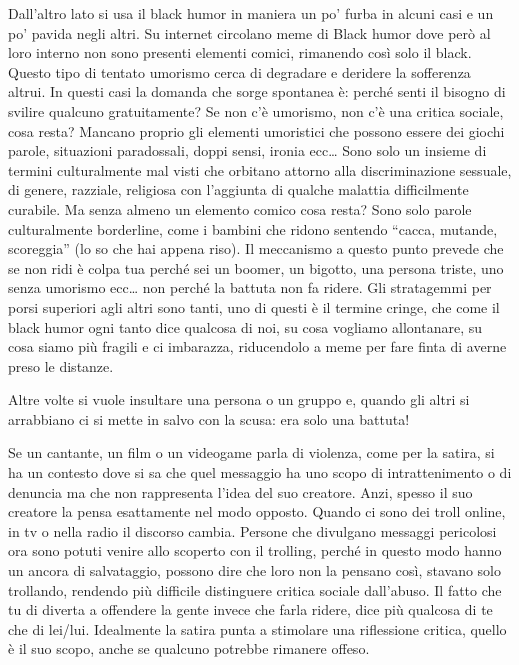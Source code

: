 \documentclass[12pt]{book} %
\begin{document}
\begin{mdframed}[linewidth=1pt]
Dall'altro lato si usa il black humor in maniera un po' furba in alcuni casi e
un po' pavida negli altri. Su internet circolano meme di Black humor dove però al loro interno non
sono presenti elementi comici, rimanendo così solo il black. Questo tipo di tentato umorismo cerca di degradare e
deridere la sofferenza altrui. In questi casi la domanda che sorge spontanea è: perché senti il bisogno di svilire
qualcuno gratuitamente? Se non c'è umorismo, non c'è una critica sociale, cosa resta? Mancano proprio gli elementi
umoristici che possono essere dei giochi parole, situazioni paradossali, doppi sensi, ironia ecc… Sono solo un insieme
di termini culturalmente mal visti che orbitano attorno alla discriminazione sessuale, di genere, razziale, religiosa
con l'aggiunta di qualche malattia difficilmente curabile. Ma senza almeno un elemento comico cosa
resta? Sono solo parole culturalmente borderline, come i bambini che ridono sentendo “cacca, mutande, scoreggia” (lo so
che hai appena riso). Il meccanismo a questo punto prevede che se non ridi è colpa tua perché sei un boomer, un
bigotto, una persona triste, uno senza umorismo ecc… non perché la battuta non fa ridere.
Gli stratagemmi per porsi superiori agli altri sono tanti, uno di questi è il termine cringe, che come il black humor ogni tanto dice qualcosa di noi, su cosa vogliamo allontanare, su cosa siamo più fragili e ci imbarazza, riducendolo a meme per fare finta di averne preso le distanze.

Altre volte si vuole insultare una persona o un gruppo e, quando gli altri si arrabbiano ci si mette in salvo con la
scusa: era solo una battuta!

Se un cantante, un film o un videogame parla di violenza, come per la satira, si ha un contesto dove si sa che quel messaggio ha uno scopo di intrattenimento o di denuncia ma che non rappresenta l'idea del suo creatore. Anzi, spesso il suo creatore la pensa esattamente nel modo opposto. Quando ci sono dei troll online, in tv o nella radio il discorso cambia. Persone che divulgano messaggi pericolosi ora sono potuti venire allo scoperto con il trolling, perché in questo modo hanno un ancora di salvataggio, possono dire che loro non la pensano così, stavano solo trollando, rendendo più difficile distinguere critica sociale dall'abuso.
Il fatto che tu di diverta a offendere la gente invece che farla ridere, dice più qualcosa di te che di lei/lui.
Idealmente la satira punta a stimolare una riflessione critica, quello è il suo scopo, anche se qualcuno potrebbe rimanere offeso.


\end{mdframed}
\end{document}
